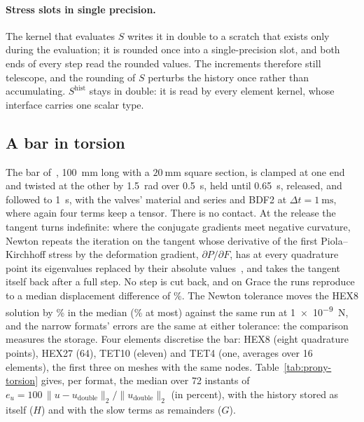 \documentclass[sigconf,nonacm]{acmart}
\begin{document}
\paragraph{Stress slots in single precision.} The kernel that evaluates $S$ writes it in double to a
scratch that exists only during the evaluation; it is rounded once into a single-precision slot,
and both ends of every step read the rounded values. The increments therefore still telescope, and
the rounding of $S$ perturbs the history once rather than accumulating. $S^{\mathrm{hist}}$ stays in
double: it is read by every element kernel, whose interface carries one scalar type.

\begin{table}
\caption{FF200's persistent Prony state by part (MB) per storage of the stress slots and the
history, against the tangent and the mesh. The narrow formats store the two slow terms as
remainders; $R$ is their reference stress. Averages over runs of 16 elements.}
\label{tab:prony-memory}
\small
\setlength{\tabcolsep}{3.5pt}

\end{table}

\subsection{A bar in torsion}

The bar of~\cite{yang2026prony}, \SI{100}{\milli\metre} long with a $\SI{20}{\milli\metre}$ square
section, is clamped at one end and twisted at the other by \SI{1.5}{\radian} over \SI{0.5}{\second},
held until \SI{0.65}{\second}, released, and followed to \SI{1}{\second}, with the valves' material
and series and BDF2 at $\Delta t=\SI{1}{\milli\second}$, where again four terms keep a tensor. There is
no contact. At the release the tangent turns indefinite: where the conjugate gradients meet negative
curvature, Newton repeats the iteration on the tangent whose derivative of the first
Piola--Kirchhoff stress by the deformation gradient, $\partial P/\partial F$, has at every
quadrature point its eigenvalues replaced by their absolute values~\cite{chen2024abs,longva2023},
and takes the tangent itself back after a full step. No step is cut back, and on Grace the runs
reproduce to a median displacement difference of \hsTorsionNoiseMax\%. The Newton tolerance moves the
HEX8 solution by \hsTolTorsion\% in the median (\hsTolTorsionMax\% at most) against the same run at
\SI{1e-9}{\newton}, and the narrow formats' errors are the same at either tolerance: the comparison
measures the storage. Four elements discretise the bar: HEX8 (eight quadrature points), HEX27 (64), TET10
(eleven) and TET4 (one, averages over 16 elements), the first three on meshes with the same nodes.
Table~\ref{tab:prony-torsion} gives, per format, the median over 72 instants of
$e_u = 100\,\lVert u - u_{\mathrm{double}}\rVert_2/\lVert u_{\mathrm{double}}\rVert_2$ (in percent),
with the history stored as itself ($H$) and with the slow terms as remainders ($G$).
\end{document}
